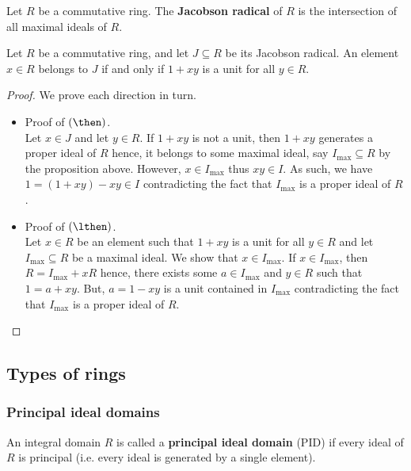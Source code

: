 \documentclass[12pt, a4paper]{article}
\begin{document}
\begin{definition}
    Let \(R\) be a commutative ring. The \textbf{Jacobson radical} of \(R\) is the intersection of all maximal ideals of \(R\).
\end{definition}

\begin{mdprop}\label{Jacobson rad}
    Let \(R\) be a commutative ring, and let \(J \subseteq R\) be its Jacobson radical. An element \(x\in R\) belongs to \(J\) if and only if \(1+xy\) is a unit for all \(y \in R\).
\end{mdprop}

\begin{proof}
    We prove each direction in turn.
    \begin{itemize}
        \item Proof of \((\then)\). \\
        Let \(x \in J\) and let \(y\in R\). If \(1+xy\) is not a unit, then \(1+xy\) generates a proper ideal of \(R\) hence, it belongs to some maximal ideal, say \(I_{\text{max}} \subseteq R\) by the proposition above. However, \(x \in I_{\text{max}}\) thus \(xy\in I\). As such, we have \(1=(1+xy)-xy \in I\) contradicting the fact that \(I_{\text{max}}\) is a proper ideal of \(R\).
        \item Proof of \((\lthen)\). \\
        Let \(x \in R\) be an element such that \(1+xy\) is a unit for all \(y \in R\) and let \(I_{\text{max}} \subseteq R\) be a maximal ideal. We show that \(x\in I_{\text{max}}\). If \(x\in I_{\text{max}}\), then \(R = I_{\text{max}}+xR\) hence, there exists some \(a \in I_{\text{max}}\) and \(y \in R\) such that \(1=a+xy\). But, \(a=1-xy\) is a unit contained in \(I_{\text{max}}\) contradicting the fact that \(I_{\text{max}}\) is a proper ideal of \(R\).
    \end{itemize}
\end{proof}

\subsection{Types of rings}

\subsubsection{Principal ideal domains}

\begin{definition}
    An integral domain \(R\) is called a \textbf{principal ideal domain} (PID) if every ideal of \(R\) is principal (i.e. every ideal is generated by a single element).
\end{definition}
\end{document}
